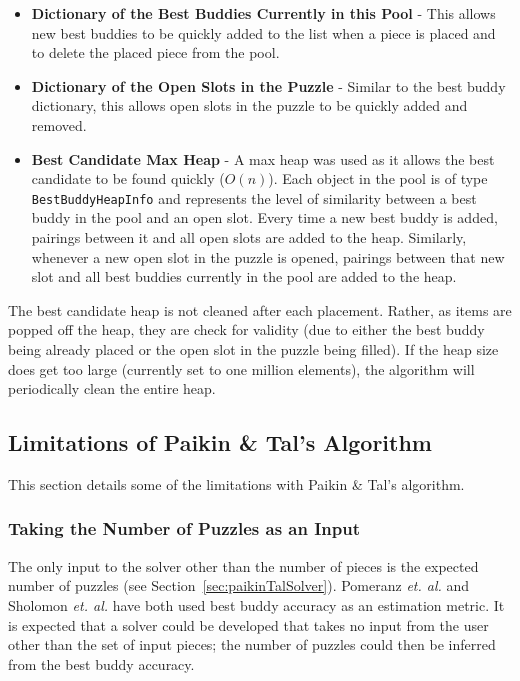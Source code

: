 \documentclass{report}
\begin{document}
\begin{itemize}

	\item \textbf{Dictionary of the Best Buddies Currently in this Pool} - This allows new best buddies to be quickly added to the list when a piece is placed and to delete the placed piece from the pool.
	
	\item \textbf{Dictionary of the Open Slots in the Puzzle} - Similar to the best buddy dictionary, this allows open slots in the puzzle to be quickly added and removed.

	\item \textbf{Best Candidate Max Heap} - A max heap was used as it allows the best candidate to be found quickly ($O(n)$).  Each object in the pool is of type \texttt{BestBuddyHeapInfo} and represents the level of similarity between a best buddy in the pool and an open slot.  Every time a new best buddy is added, pairings between it and all open slots are added to the heap.  Similarly, whenever a new open slot in the puzzle is opened, pairings between that new slot and all best buddies currently in the pool are added to the heap.  

\end{itemize}

The best candidate heap is not cleaned after each placement.  Rather, as items are popped off the heap, they are check for validity (due to either the best buddy being already placed or the open slot in the puzzle being filled). If the heap size does get too large (currently set to one million elements), the algorithm will periodically clean the entire heap.

\subsection{Limitations of Paikin \& Tal's Algorithm}\label{sec:paikinTalLimitations}

This section details some of the limitations with Paikin \& Tal's algorithm.  

\subsubsection{Taking the Number of Puzzles as an Input}\label{sec:limitationNumberPuzzles}

The only input to the solver other than the number of pieces is the expected number of puzzles (see Section~\ref{sec:paikinTalSolver}). Pomeranz \textit{et. al.} and Sholomon \textit{et. al.} have both used best buddy accuracy as an estimation metric.  It is expected that a solver could be developed that takes no input from the user other than the set of input pieces; the number of puzzles could then be inferred from the best buddy accuracy.
\end{document}

